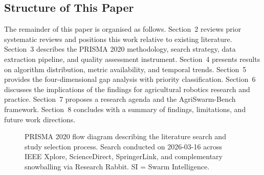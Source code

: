 \documentclass[review,3p,times]{elsarticle}
\begin{document}
\subsection{Structure of This Paper}

The remainder of this paper is organised as follows. Section~2 reviews prior systematic reviews and positions this work relative to existing literature. Section~3 describes the PRISMA 2020 methodology, search strategy, data extraction pipeline, and quality assessment instrument. Section~4 presents results on algorithm distribution, metric availability, and temporal trends. Section~5 provides the four-dimensional gap analysis with priority classification. Section~6 discusses the implications of the findings for agricultural robotics research and practice. Section~7 proposes a research agenda and the AgriSwarm-Bench framework. Section~8 concludes with a summary of findings, limitations, and future work directions.


\begin{figure}[htbp]
\centering
{}
\caption{PRISMA 2020 flow diagram describing the literature search and study selection process. Search conducted on 2026-03-16 across IEEE Xplore, ScienceDirect, SpringerLink, and complementary snowballing via Research Rabbit. SI = Swarm Intelligence.}
\label{fig:prisma}
\end{figure}
\end{document}
